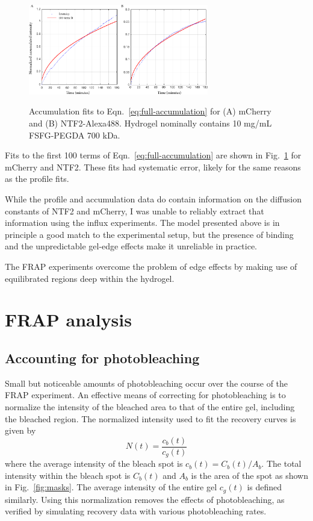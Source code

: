 \begin{figure}
\caption[Fits to accumulation curves.]{Accumulation fits to Eqn.~\ref{eq:full-accumulation} for (A) mCherry and (B) NTF2-Alexa488.  Hydrogel nominally contains 10 mg/mL FSFG-PEGDA 700 kDa.\\}
\centering
\includegraphics[width=0.7\textwidth]{figs/ch04/accumulation.pdf}
\label{fig:acc}
\end{figure} 


Fits to the first 100 terms of Eqn.~\ref{eq:full-accumulation} are shown in Fig.~\ref{fig:acc} for mCherry and NTF2.  These fits had systematic error, likely for the same reasons as the profile fits.

While the profile and accumulation data do contain information on the diffusion constants of NTF2 and mCherry, I was unable to reliably extract that information using the influx experiments.  The model presented above is in principle a good match to the experimental setup, but the presence of binding and the unpredictable gel-edge effects make it unreliable in practice.  

The FRAP experiments overcome the problem of edge effects by making use of equilibrated regions deep within the hydrogel.

\section{FRAP analysis}
\label{sec:FRAP-analysis}

\subsection{Accounting for photobleaching}
\label{sec:photobleaching}
Small but noticeable amounts of photobleaching occur over the course of the FRAP experiment.  An effective means of correcting for photobleaching is to normalize the intensity of the bleached area to that of the entire gel, including the bleached region.  The normalized intensity used to fit the recovery curves is given by
\begin{equation}
N(t) = \frac{c_b(t)}{c_g(t)}
\end{equation} where the average intensity of the bleach spot is $c_b(t) = C_b(t)/A_b$. The total intensity within the bleach spot is $C_b(t)$ and $A_b$ is the area of the spot as shown in Fig.~\ref{fig:masks}.  The average intensity of the entire gel $c_g(t)$ is defined similarly.  Using this normalization removes the effects of photobleaching, as verified by simulating recovery data with various photobleaching rates.

